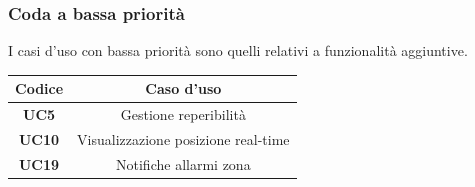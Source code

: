 \subsubsection{Coda a bassa priorità}
I casi d'uso con bassa priorità sono quelli relativi a funzionalità aggiuntive.
	\begin{center}
		\begin{tabular}{|c|c|}
			\hline
			\textbf{Codice} & \textbf{Caso d'uso} \\ \hline
			\textbf{UC5} & Gestione reperibilità\\ \hline
			\textbf{UC10} & Visualizzazione posizione real-time\\ \hline
			\textbf{UC19} & Notifiche allarmi zona\\ \hline

		\end{tabular}
	\end{center}

